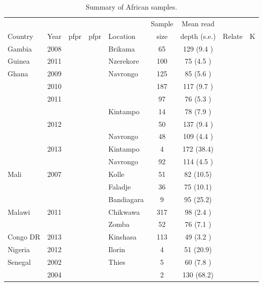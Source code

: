 \documentclass[9pt,lineno]{elife}
\begin{document}
\begin{table}[bt]
  \caption{Summary of African samples.}\label{tab:Pf3kAfrica}
\begin{tabular}{l c c c |l c c c c}
\toprule
        &          &&&         & Sample & Mean read             & & \\
Country &   Year   &pfpr&pfpr&Location & size   & depth (s.e.)  & Relate & K\\
\midrule
Gambia          &2008           &&&Brikama&65   &129  (9.4 )     &     &\\
\hline
Guinea          &2011           &&&Nzerekore&100  &75   (4.5 )     &     &\\
\hline
Ghana           &2009           &&&Navrongo&125  &85   (5.6 )     &     &\\
                &2010           &&&               &187  &117  (9.7 )     &     &\\
                &2011           &&&               &97   &76   (5.3 )     &     &\\
                &               &&&Kintampo&14   &78   (7.9 )     &     &\\
                &2012           &&&               &50   &137  (9.4 )     &     &\\
                &               &&&Navrongo&48   &109  (4.4 )     &     &\\
                &2013           &&&Kintampo&4    &172  (38.4)     &     &\\
                &               &&&Navrongo&92   &114  (4.5 )     &     &\\
\hline
Mali            &2007           &&&Kolle&51   &82   (10.5)     &     &\\
                &               &&&Faladje&36   &75   (10.1)     &     &\\
                &               &&&Bandiagara&9    &95   (25.2)     &     &\\
\hline
Malawi          &2011           &&&Chikwawa&317  &98   (2.4 )     &     &\\
                &               &&&Zomba&52   &76   (7.1 )     &     &\\
\hline
Congo DR        &2013           &&&Kinshasa&113  &49   (3.2 )     &     &\\
\hline
Nigeria         &2012           &&&Ilorin&4    &51   (20.9)     &     &\\
\hline
Senegal         &2002           &&&Thies&5    &60   (7.8 )     &     &\\
                &2004           &&&               &2    &130  (68.2)     &     &\\

\end{tabular}
\end{table}
\end{document}
